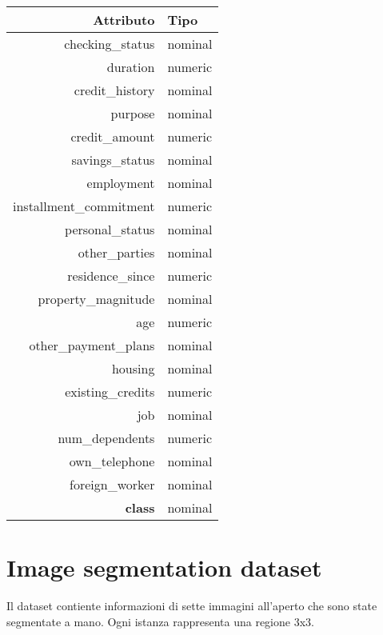 \begin{table}[!htb]
	\centering
	\begin{tabular}{|r|l|}
		\hline
		Attributo & Tipo \\ 
		\hline
		checking\_status & nominal \\ 
		duration & numeric \\ 
		credit\_history & nominal \\ 
		purpose & nominal \\ 
		credit\_amount & numeric \\ 
		savings\_status & nominal \\ 
		employment & nominal \\ 
		installment\_commitment & numeric \\ 
		personal\_status & nominal \\ 
		other\_parties & nominal \\ 
		residence\_since & numeric \\ 
		property\_magnitude & nominal \\ 
		age & numeric \\ 
		other\_payment\_plans & nominal \\ 
		housing & nominal \\ 
		existing\_credits & numeric \\ 
		job & nominal \\ 
		num\_dependents & numeric \\ 
		own\_telephone & nominal \\ 
		foreign\_worker & nominal \\ 
		\textbf{class} & nominal \\ 
		\hline
	\end{tabular}
\end{table}

\pagebreak 

\section{Image segmentation dataset}

Il dataset contiente informazioni di sette immagini all'aperto che sono state segmentate a mano. Ogni istanza rappresenta una regione 3x3.


